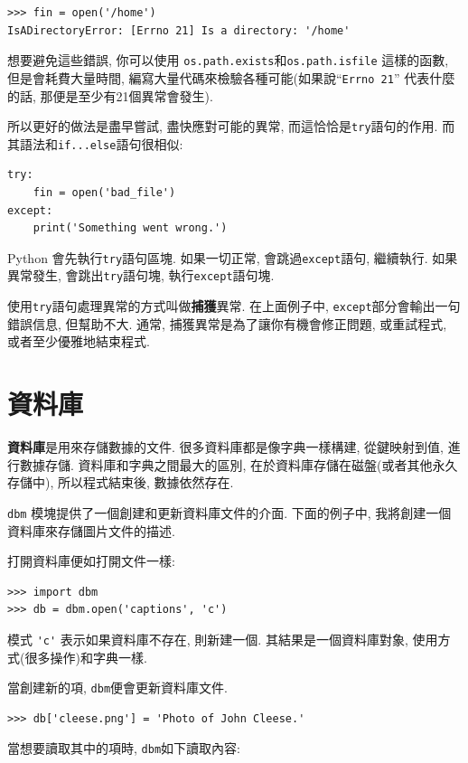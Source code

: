 \documentclass[10pt]{book}
\begin{document}
\begin{verbatim}
>>> fin = open('/home')
IsADirectoryError: [Errno 21] Is a directory: '/home'
\end{verbatim}
%
想要避免這些錯誤, 你可以使用 {\tt os.path.exists}和{\tt os.path.isfile} 這樣的函數, 
但是會耗費大量時間, 編寫大量代碼來檢驗各種可能(如果說``{\tt Errno 21}'' 代表什麼的話, 
那便是至少有21個異常會發生). 


所以更好的做法是盡早嘗試, 盡快應對可能的異常, 而這恰恰是{\tt try}語句的作用. 
而其語法和{\tt if...else}語句很相似:

\begin{verbatim}
try:    
    fin = open('bad_file')
except:
    print('Something went wrong.')
\end{verbatim}
%
Python 會先執行{\tt try}語句區塊. 
如果一切正常, 會跳過{\tt except}語句, 繼續執行. 
如果異常發生, 會跳出{\tt try}語句塊, 執行{\tt except}語句塊. 

使用{\tt try}語句處理異常的方式叫做{\bf 捕獲}異常. 
在上面例子中, {\tt except}部分會輸出一句錯誤信息, 但幫助不大. 
通常, 捕獲異常是為了讓你有機會修正問題, 或重試程式, 或者至少優雅地結束程式. 


\section{資料庫}

{\bf 資料庫}是用來存儲數據的文件. 
很多資料庫都是像字典一樣構建, 從鍵映射到值, 進行數據存儲. 
資料庫和字典之間最大的區別, 在於資料庫存儲在磁盤(或者其他永久存儲中), 
所以程式結束後, 數據依然存在. 
 

 {\tt dbm} 模塊提供了一個創建和更新資料庫文件的介面. 
下面的例子中, 我將創建一個資料庫來存儲圖片文件的描述. 

打開資料庫便如打開文件一樣:

\begin{verbatim}
>>> import dbm
>>> db = dbm.open('captions', 'c')
\end{verbatim}
%

模式 \verb"'c'" 表示如果資料庫不存在, 則新建一個. 
其結果是一個資料庫對象, 使用方式(很多操作)和字典一樣.

當創建新的項, {\tt dbm}便會更新資料庫文件.

\begin{verbatim}
>>> db['cleese.png'] = 'Photo of John Cleese.'
\end{verbatim}
%
當想要讀取其中的項時,  {\tt dbm}如下讀取內容:
\end{document}
